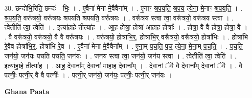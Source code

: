 \documentclass[17pt]{extarticle}
\begin{document}
30. छन्दो॑भि॒रिति॒ छन्दः॑ - भिः॒ । . ए॒वैना॑ मेना मे॒वैवैना᳚म् । . ए॒नाꣳ॒॒ श्र॒प॒य॒ति॒ श्र॒प॒य॒ त्ये॒ना॒ मे॒नाꣳ॒॒ श्र॒प॒य॒ति॒ । . श्र॒प॒य॒ति॒ वरू᳚त्रयो॒ वरू᳚त्रयः श्रपयति श्रपयति॒ वरू᳚त्रयः । . वरू᳚त्रय स्त्वा त्वा॒ वरू᳚त्रयो॒ वरू᳚त्रय स्त्वा । . त्वेतीति॑ त्वा॒ त्वेति॑ । . इत्या॑हा॒हे तीत्या॑ह । . आ॒ह॒ होत्रा॒ होत्रा॑ आहाह॒ होत्राः᳚ । . होत्रा॒ वै वै होत्रा॒ होत्रा॒ वै । . वै वरू᳚त्रयो॒ वरू᳚त्रयो॒ वै वै वरू᳚त्रयः । . वरू᳚त्रयो॒ होत्रा॑भि॒र्॒. होत्रा॑भि॒र् वरू᳚त्रयो॒ वरू᳚त्रयो॒ होत्रा॑भिः । . होत्रा॑भि रे॒वैव होत्रा॑भि॒र्॒. होत्रा॑भि रे॒व । . ए॒वैना॑ मेना मे॒वैवैना᳚म् । . ए॒ना॒म् प॒च॒ति॒ प॒च॒ त्ये॒ना॒ मे॒ना॒म् प॒च॒ति॒ । . प॒च॒ति॒ जन॑यो॒ जन॑यः पचति पचति॒ जन॑यः । . जन॑य स्त्वा त्वा॒ जन॑यो॒ जन॑य स्त्वा । . त्वेतीति॑ त्वा॒ त्वेति॑ । . इत्या॑हा॒हे तीत्या॑ह । . आ॒ह॒ दे॒वाना᳚म् दे॒वाना॑ माहाह दे॒वाना᳚म् । . दे॒वानां॒ ॅवै वै दे॒वाना᳚म् दे॒वानां॒ ॅवै । . वै पत्नीः॒ पत्नी॒र् वै वै पत्नीः᳚ । . पत्नी॒र् जन॑यो॒ जन॑यः॒ पत्नीः॒ पत्नी॒र् जन॑यः । \newline

\textbf{Ghana Paata } \newline
\end{document}
